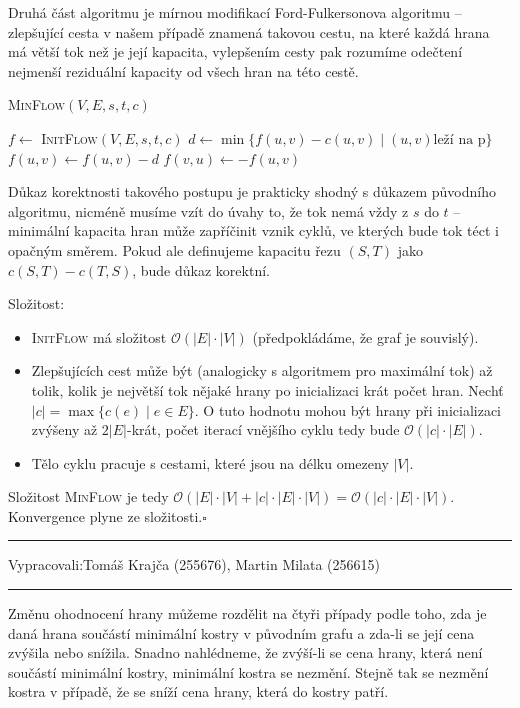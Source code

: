 \documentclass[12pt]{article}
\newcommand{\la}{\leftarrow}
\renewcommand{\O}{\mathcal{O}}
\newcommand{\zadani}[2]{
{\large
\noindent {\bf IB108 \hfill{} Sada #1, Příklad #2 \\[-4mm]}
\noindent\hrule
\vspace{2mm}
\noindent Vypracovali:\hfill{}Tomáš Krajča (255676), Martin Milata (256615)
\vspace{3mm}
\hrule
\bigskip\bigskip}
}
\begin{document}
\noindent
Druhá část algoritmu je mírnou modifikací Ford-Fulkersonova algoritmu -- zlepšující cesta v
našem případě znamená takovou cestu, na které každá hrana má větší tok než je její kapacita,
vylepšením cesty pak rozumíme odečtení nejmenší reziduální kapacity od všech hran na této cestě.

\begin{algorithm}
\textsc{MinFlow}$(V,E,s,t,c)$
\begin{algorithmic}
\STATE $f \la $ \textsc{InitFlow}$(V,E,s,t,c)$
\STATE $d \la \min\{f(u,v) - c(u,v) \mid (u,v) \text{leží na p}\}$
\STATE $f(u,v) \la f(u,v) - d$
\STATE $f(v,u) \la -f(u,v)$
\ENDFOR
\ENDWHILE
\end{algorithmic}
\end{algorithm}

Důkaz korektnosti takového postupu je prakticky shodný s důkazem původního algoritmu, nicméně musíme
vzít do úvahy to, že tok nemá vždy  z $s$ do $t$ -- minimální kapacita hran může zapříčinit
vznik cyklů, ve kterých bude tok téct i opačným směrem. Pokud ale definujeme kapacitu řezu
$(S,T)$ jako $c(S,T) - c(T,S)$, bude důkaz korektní.

\noindent
Složitost:
\begin{itemize}
\item \textsc{InitFlow} má složitost $\O(|E|\cdot|V|)$ (předpokládáme, že graf je souvislý).
\item Zlepšujících cest může být (analogicky s algoritmem pro maximální tok) až tolik, kolik je
největší tok nějaké hrany po inicializaci krát počet hran.  Nechť $|c| = \max\{c(e) \mid e \in E\}$. O tuto hodnotu mohou být
hrany při inicializaci zvýšeny až $2|E|$-krát, počet iterací vnějšího cyklu tedy bude $\O(|c|\cdot|E|)$.
\item Tělo cyklu pracuje s cestami, které jsou na délku omezeny $|V|$.
\end{itemize}
Složitost \textsc{MinFlow} je tedy $\O(|E|\cdot|V| + |c|\cdot|E|\cdot|V|) =
\O(|c|\cdot|E|\cdot|V|)$. Konvergence plyne ze složitosti.\hfill$\square$



\clearpage
\zadani{3}{4}

\noindent
Změnu ohodnocení hrany můžeme rozdělit na čtyři případy podle toho, zda je daná hrana součástí
minimální kostry v původním grafu a zda-li se její cena zvýšila nebo snížila.  Snadno nahlédneme, že
zvýší-li se cena hrany, která není součástí minimální kostry, minimální kostra se nezmění. Stejně
tak se nezmění kostra v případě, že se sníží cena hrany, která do kostry patří.
\end{document}
